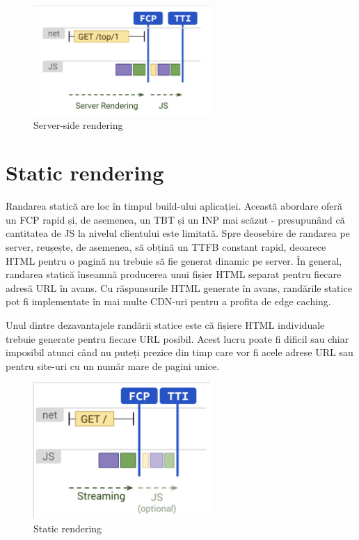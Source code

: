 \documentclass[12pt, a4paper]{report}
\begin{document}
\begin{figure}[htbp]
	\centering
	\includegraphics[width=0.6\textwidth]{ssr.png}
	\caption{Server-side rendering}
	\label{fig:ssr}
\end{figure}

\section{Static rendering}
Randarea statică are loc în timpul build-ului aplicației. Această abordare oferă un FCP rapid și, de asemenea, un TBT și un INP mai scăzut - presupunând că cantitatea de JS la nivelul clientului este limitată. Spre deosebire de randarea pe server, reușește, de asemenea, să obțină un TTFB constant rapid, deoarece HTML pentru o pagină nu trebuie să fie generat dinamic pe server. În general, randarea statică înseamnă producerea unui fișier HTML separat pentru fiecare adresă URL în avans. Cu răspunsurile HTML generate în avans, randările statice pot fi implementate în mai multe CDN-uri pentru a profita de edge caching.

Unul dintre dezavantajele randării statice este că fișiere HTML individuale trebuie generate pentru fiecare URL posibil. Acest lucru poate fi dificil sau chiar imposibil atunci când nu puteți prezice din timp care vor fi acele adrese URL sau pentru site-uri cu un număr mare de pagini unice.

\begin{figure}[htbp]
	\centering
	\includegraphics[width=0.6\textwidth]{static-rendering.png}
	\caption{Static rendering}
	\label{fig:sr}
\end{figure}
\end{document}
